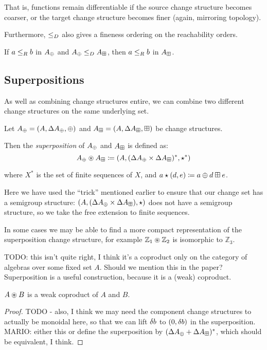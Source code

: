That is, functions remain differentiable if the source change structure becomes
coarser, or the target change structure becomes finer (again, mirroring topology).

Furthermore, $\leq_D$ also gives a fineness ordering on the reachability orders.

\begin{prop}
  If $a \leq_R b$ in $A_\oplus$ and $A_\oplus \leq_D A_\boxplus$, then $a \leq_R b$ in $A_\boxplus$.
\end{prop}

\subsection{Superpositions}

As well as combining change structures entire, we can combine two different
change structures on the same underlying set.

\begin{defn}[Superposition]
  Let $A_\oplus = (A,\Delta A_\oplus,\oplus)$ and $A_\boxplus =
  (A,\Delta A_\boxplus,\boxplus)$ be change structures.

  Then the \textit{superposition} of $A_\oplus$ and $A_\boxplus$ is defined as:
  $$A_\oplus \circledast A_\boxplus \coloneqq (A,
    (\Delta A_\oplus \times \Delta A_\boxplus)^\ast,\star^\ast)$$

  where $X^\ast$ is the set of finite sequences of $X$, and $a \star (d, e)
  \coloneqq a \oplus d \boxplus e$.
\end{defn}

Here we have used the ``trick'' mentioned earlier to ensure that our change
set has a semigroup structure: $(A,(\Delta A_\oplus \times
  \Delta A_\boxplus),\star)$ does not have a semigroup structure, so we take
the free extension to finite sequences.

In some cases we may be able to find a more compact representation of the
superposition change structure, for example $\mathbb{Z}_1 \circledast \mathbb{Z}_2$ is isomorphic to $\mathbb{Z}_3$.

TODO: this isn't quite right, I think it's a coproduct only on the category of algebras over some fixed 
set $A$. Should we mention this in the paper?
Superposition is a useful construction, because it is a (weak) coproduct.

\begin{prop}
  $A \circledast B$ is a weak coproduct of $A$ and $B$.
\end{prop}
\begin{proof}
  TODO - also, I think we may need the component change structures to actually
  be monoidal here, so that we can lift $\delta b$ to $(0, \delta b)$ in
  the superposition.
  MARIO: either this or define the superposition by $(\Delta A_\oplus + \Delta A_\boxplus)^\ast$,
  which should be equivalent, I think.
\end{proof}

